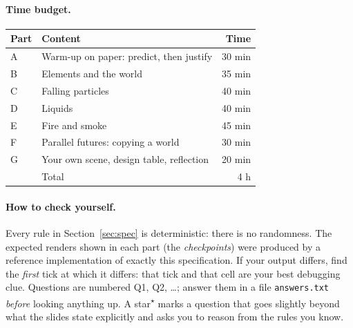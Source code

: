 \documentclass[11pt,a4paper]{article}
\newcommand{\code}[1]{\texttt{#1}}
\newcommand{\beyond}{\textsuperscript{$\star$}}
\begin{document}
\paragraph{Time budget.}
\begin{center}
\begin{tabular}{@{}llr@{}}
\toprule
Part & Content & Time \\
\midrule
A & Warm-up on paper: predict, then justify & 30 min \\
B & Elements and the world & 35 min \\
C & Falling particles & 40 min \\
D & Liquids & 40 min \\
E & Fire and smoke & 45 min \\
F & Parallel futures: copying a world & 30 min \\
G & Your own scene, design table, reflection & 20 min \\
\midrule
 & Total & 4 h \\
\bottomrule
\end{tabular}
\end{center}

\paragraph{How to check yourself.}
Every rule in Section~\ref{sec:spec} is deterministic: there is no randomness. The expected
renders shown in each part (the \emph{checkpoints}) were produced by a reference implementation of
exactly this specification. If your output differs, find the \emph{first} tick at which it differs:
that tick and that cell are your best debugging clue. Questions are numbered
Q1, Q2, \ldots; answer them in a file \code{answers.txt} \emph{before} looking anything up.
A star\beyond{} marks a question that goes slightly beyond what the slides state explicitly and
asks you to reason from the rules you know.
\end{document}
